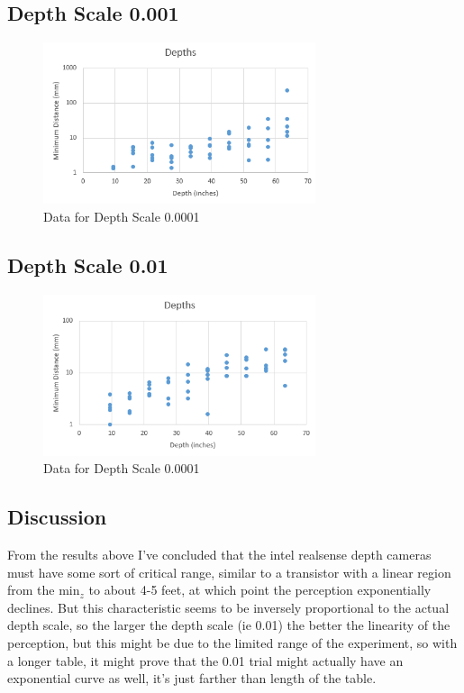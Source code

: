 \documentclass{article}
\begin{document}
					\subsection{Depth Scale 0.001}
						\begin{figure}[h]
							\includegraphics[width=8cm]{./images/DS_001.png}
							\centering
							\caption{Data for Depth Scale 0.0001}
							\label{fig:ds0.0001}
						\end{figure}
					
					\newpage
					\subsection{Depth Scale 0.01}
						\begin{figure}[h]
							\includegraphics[width=8cm]{./images/DS_01.png}
							\centering
							\caption{Data for Depth Scale 0.0001}
							\label{fig:ds0.0001}
						\end{figure}
					
					\subsection{Discussion}
						From the results above I've concluded that the intel realsense depth cameras must have some sort of critical range, similar to a transistor with a linear region from the min$_z$ to about 4-5 feet, at which point the perception exponentially declines. But this characteristic seems to be inversely proportional to the actual depth scale, so the larger the depth scale (ie 0.01) the better the linearity of the perception, but this might be due to the limited range of the experiment, so with a longer table, it might prove that the 0.01 trial might actually have an exponential curve as well, it's just farther than length of the table.
			
		\newpage
		
		\listoffigures
	
\end{document}
